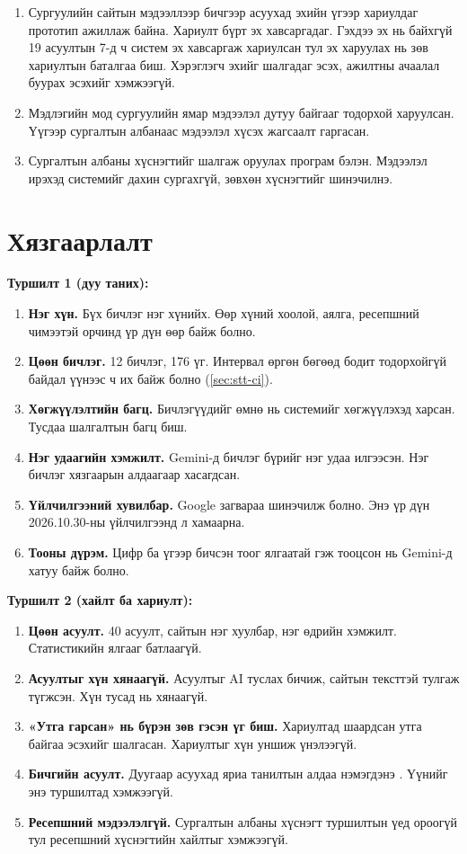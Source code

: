 \begin{enumerate}
    \item Сургуулийн сайтын мэдээллээр бичгээр асуухад эхийн үгээр хариулдаг прототип ажиллаж байна. Хариулт бүрт эх хавсаргадаг. Гэхдээ эх нь байхгүй 19 асуултын 7-д ч систем эх хавсаргаж хариулсан тул эх харуулах нь зөв хариултын баталгаа биш. Хэрэглэгч эхийг шалгадаг эсэх, ажилтны ачаалал буурах эсэхийг хэмжээгүй.
    \item Мэдлэгийн мод сургуулийн ямар мэдээлэл дутуу байгааг тодорхой харуулсан. Үүгээр сургалтын албанаас мэдээлэл хүсэх жагсаалт гаргасан.
    \item Сургалтын албаны хүснэгтийг шалгаж оруулах програм бэлэн. Мэдээлэл ирэхэд системийг дахин сургахгүй, зөвхөн хүснэгтийг шинэчилнэ.
\end{enumerate}

\section{Хязгаарлалт}
\label{sec:limits}

\textbf{Туршилт 1 (дуу таних):}
\begin{enumerate}
    \item \textbf{Нэг хүн.} Бүх бичлэг нэг хүнийх. Өөр хүний хоолой, аялга, ресепшний чимээтэй орчинд үр дүн өөр байж болно.
    \item \textbf{Цөөн бичлэг.} 12 бичлэг, 176 үг. Интервал өргөн бөгөөд бодит тодорхойгүй байдал үүнээс ч их байж болно (\ref{sec:stt-ci}).
    \item \textbf{Хөгжүүлэлтийн багц.} Бичлэгүүдийг өмнө нь системийг хөгжүүлэхэд харсан. Тусдаа шалгалтын багц биш.
    \item \textbf{Нэг удаагийн хэмжилт.} Gemini-д бичлэг бүрийг нэг удаа илгээсэн. Нэг бичлэг хязгаарын алдаагаар хасагдсан.
    \item \textbf{Үйлчилгээний хувилбар.} Google загвараа шинэчилж болно. Энэ үр дүн 2026.10.30-ны үйлчилгээнд л хамаарна.
    \item \textbf{Тооны дүрэм.} Цифр ба үгээр бичсэн тоог ялгаатай гэж тооцсон нь Gemini-д хатуу байж болно.
\end{enumerate}

\textbf{Туршилт 2 (хайлт ба хариулт):}
\begin{enumerate}
    \item \textbf{Цөөн асуулт.} 40 асуулт, сайтын нэг хуулбар, нэг өдрийн хэмжилт. Статистикийн ялгааг батлаагүй.
    \item \textbf{Асуултыг хүн хянаагүй.} Асуултыг AI туслах бичиж, сайтын тексттэй тулгаж түгжсэн. Хүн тусад нь хянаагүй.
    \item \textbf{«Утга гарсан» нь бүрэн зөв гэсэн үг биш.} Хариултад шаардсан утга байгаа эсэхийг шалгасан. Хариултыг хүн уншиж үнэлээгүй.
    \item \textbf{Бичгийн асуулт.} Дуугаар асуухад яриа танилтын алдаа нэмэгдэнэ \cite{sidiropoulos2022asr}. Үүнийг энэ туршилтад хэмжээгүй.
    \item \textbf{Ресепшний мэдээлэлгүй.} Сургалтын албаны хүснэгт туршилтын үед ороогүй тул ресепшний хүснэгтийн хайлтыг хэмжээгүй.
\end{enumerate}

